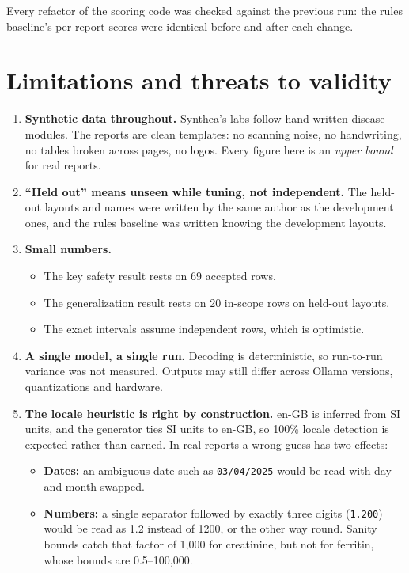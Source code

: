 \documentclass[11pt,a4paper]{article}
\begin{document}
\noindent Every refactor of the scoring code was checked against the previous run: the rules baseline's per-report scores were identical before and after each change.

\section{Limitations and threats to validity}
\label{sec:limits}
\begin{enumerate}
  \item \textbf{Synthetic data throughout.} Synthea's labs follow hand-written disease modules. The reports are clean templates: no scanning noise, no handwriting, no tables broken across pages, no logos. Every figure here is an \emph{upper bound} for real reports.
  \item \textbf{``Held out'' means unseen while tuning, not independent.} The held-out layouts and names were written by the same author as the development ones, and the rules baseline was written knowing the development layouts.
  \item \textbf{Small numbers.}
  \begin{itemize}[nosep]
    \item The key safety result rests on 69 accepted rows.
    \item The generalization result rests on 20 in-scope rows on held-out layouts.
    \item The exact intervals assume independent rows, which is optimistic.
  \end{itemize}
  \item \textbf{A single model, a single run.} Decoding is deterministic, so run-to-run variance was not measured. Outputs may still differ across Ollama versions, quantizations and hardware.
  \item \textbf{The locale heuristic is right by construction.} en-GB is inferred from SI units, and the generator ties SI units to en-GB, so 100\% locale detection is expected rather than earned. In real reports a wrong guess has two effects:
  \begin{itemize}
    \item \textbf{Dates:} an ambiguous date such as \texttt{03/04/2025} would be read with day and month swapped.
    \item \textbf{Numbers:} a single separator followed by exactly three digits (\texttt{1.200}) would be read as 1.2 instead of 1200, or the other way round. Sanity bounds catch that factor of 1,000 for creatinine, but not for ferritin, whose bounds are 0.5--100,000.

\end{itemize}
\end{enumerate}
\end{document}
